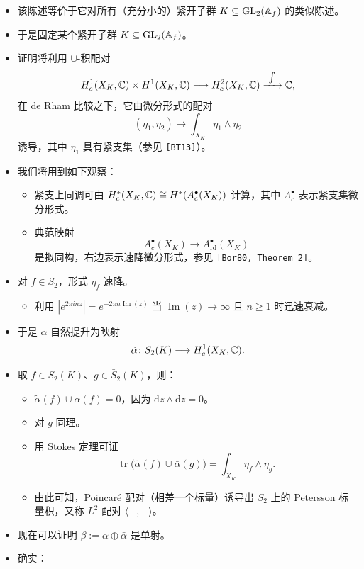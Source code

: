 \begin{itemize}
\item 该陈述等价于它对所有（充分小的）紧开子群 $K\subseteq\operatorname{GL}_2(\mathbb{A}_f)$ 的类似陈述。
\item 于是固定某个紧开子群 $K\subseteq\operatorname{GL}_2(\mathbb{A}_f)$。
\item 证明将利用 $\cup$-积配对
\[
H^1_c(X_K,\C)\times H^1(X_K,\C)\longrightarrow H^2_c(X_K,\C)\xrightarrow{\ \int\ }\C,
\]
在 de Rham 比较之下，它由微分形式的配对
\[
(\eta_1,\eta_2)\mapsto\int_{X_K}\eta_1\wedge\eta_2
\]
诱导，其中 $\eta_1$ 具有紧支集（参见 \texttt{[BT13]}）。
\item 我们将用到如下观察：
\begin{itemize}
\item 紧支上同调可由 $H^*_c(X_K,\mathbb{C})\cong H^*(A^\bullet_c(X_K))$ 计算，其中 $A^\bullet_c$ 表示紧支集微分形式。
\item 典范映射
\begin{equation}\tag{2}\label{eq:9.2}
A^\bullet_c(X_K)\longrightarrow A^\bullet_{\mathrm{rd}}(X_K)
\end{equation}
是拟同构，右边表示速降微分形式，参见 \texttt{[Bor80, Theorem 2]}。
\end{itemize}
\item 对 $f\in S_2$，形式 $\eta_f$ 速降。
\begin{itemize}
\item 利用 $|e^{2\pi inz}|=e^{-2\pi n\operatorname{Im}(z)}$ 当 $\operatorname{Im}(z)\to\infty$ 且 $n\ge1$ 时迅速衰减。
\end{itemize}
\item 于是 $\alpha$ 自然提升为映射
\[
\tilde\alpha\colon S_2(K)\longrightarrow H^1_c(X_K,\mathbb{C}).
\]
\item 取 $f\in S_2(K)$、$g\in\bar S_2(K)$，则：
\begin{itemize}
\item $\tilde\alpha(f)\cup\alpha(f)=0$，因为 $\mathrm{d}z\wedge\mathrm{d}z=0$。
\item 对 $g$ 同理。
\item 用 Stokes 定理可证
\[
\operatorname{tr}\bigl(\tilde\alpha(f)\cup\bar\alpha(g)\bigr)=\int_{X_K}\eta_f\wedge\eta_g .
\]
\item 由此可知，Poincaré 配对（相差一个标量）诱导出 $S_2$ 上的 Petersson 标量积，又称 $L^2$-配对 $\langle-,-\rangle$。
\end{itemize}
\item 现在可以证明 $\beta:=\alpha\oplus\bar\alpha$ 是单射。
\item 确实：
\begin{itemize}

\end{itemize}
\end{itemize}
